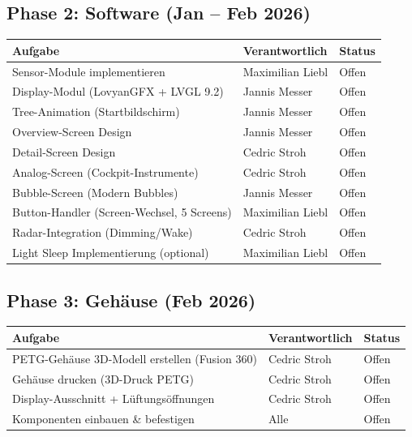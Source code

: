 \documentclass[a4paper,11pt]{article}
\begin{document}
\subsection{Phase 2: Software (Jan -- Feb 2026)}

\begin{longtable}{p{6.5cm} p{3.5cm} p{2.5cm}}
\toprule
\rowcolor{tableheader}
\textbf{Aufgabe} & \textbf{Verantwortlich} & \textbf{Status} \\
\midrule
\endhead
Sensor-Module implementieren                & Maximilian Liebl    & \textcolor{statusopen}{Offen} \\
Display-Modul (LovyanGFX + LVGL 9.2)       & Jannis Messer       & \textcolor{statusopen}{Offen} \\
Tree-Animation (Startbildschirm)            & Jannis Messer       & \textcolor{statusopen}{Offen} \\
Overview-Screen Design                      & Jannis Messer       & \textcolor{statusopen}{Offen} \\
Detail-Screen Design                        & Cedric Stroh        & \textcolor{statusopen}{Offen} \\
Analog-Screen (Cockpit-Instrumente)         & Cedric Stroh        & \textcolor{statusopen}{Offen} \\
Bubble-Screen (Modern Bubbles)              & Jannis Messer       & \textcolor{statusopen}{Offen} \\
Button-Handler (Screen-Wechsel, 5 Screens)  & Maximilian Liebl    & \textcolor{statusopen}{Offen} \\
Radar-Integration (Dimming/Wake)            & Cedric Stroh        & \textcolor{statusopen}{Offen} \\
Light Sleep Implementierung (optional)      & Maximilian Liebl    & \textcolor{statusopen}{Offen} \\
\bottomrule
\end{longtable}

\subsection{Phase 3: Gehäuse (Feb 2026)}

\begin{longtable}{p{6.5cm} p{3.5cm} p{2.5cm}}
\toprule
\rowcolor{tableheader}
\textbf{Aufgabe} & \textbf{Verantwortlich} & \textbf{Status} \\
\midrule
\endhead
PETG-Gehäuse 3D-Modell erstellen (Fusion 360) & Cedric Stroh     & \textcolor{statusopen}{Offen} \\
Gehäuse drucken (3D-Druck PETG)                & Cedric Stroh     & \textcolor{statusopen}{Offen} \\
Display-Ausschnitt + Lüftungsöffnungen         & Cedric Stroh     & \textcolor{statusopen}{Offen} \\
Komponenten einbauen \& befestigen              & Alle             & \textcolor{statusopen}{Offen} \\
\bottomrule
\end{longtable}
\end{document}
